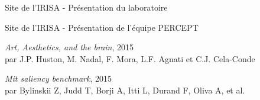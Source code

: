 
\begin{thebibliography}{99}

	  Site de l'IRISA - Présentation du laboratoire\\
      
	  Site de l'IRISA - Présentation de l'équipe PERCEPT\\

      \emph{Art, Aesthetics, and the brain}, 2015\\
      par J.P. Huston, M. Nadal, F. Mora, L.F. Agnati et C.J. Cela-Conde

      \emph{Mit saliency benchmark}, 2015\\
      par Bylinskii Z, Judd T, Borji A, Itti L, Durand F, Oliva A, et al.

\end{thebibliography}
